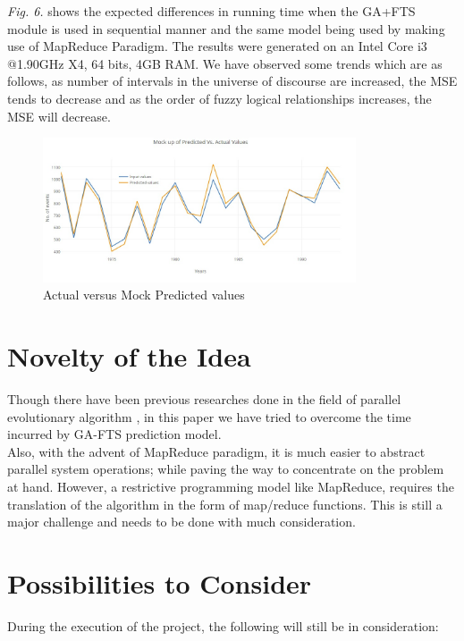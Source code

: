 \documentclass[12pt,journal,compsoc]{IEEEtran}
\begin{document}
\emph{Fig. 6.} shows the expected differences in running time when the GA+FTS module is used in sequential manner and the same model being used by making use of MapReduce Paradigm. The results were generated on an Intel Core i3 @1.90GHz X4, 64 bits, 4GB RAM.
We have observed some trends which are as follows, as number of intervals in the universe of discourse are increased, the MSE tends to decrease and as the order of fuzzy logical relationships increases, the MSE will decrease.

\begin{figure}
\includegraphics[width=3.65in]{predvsact}
\caption{Actual versus Mock Predicted values}
\end{figure}



\section{Novelty of the Idea}
Though there have been previous researches done in the field of parallel evolutionary algorithm \cite{GA-parallel}, in this paper we have tried to overcome the time incurred by GA-FTS prediction model. 
\\\indent Also, with the advent of MapReduce \cite{mapreduce} paradigm, it is much easier to abstract parallel system operations; while paving the way to concentrate on the problem at hand. However, a restrictive programming model like MapReduce, requires the translation of the algorithm in the form of map/reduce functions. This is still a major challenge and needs to be done with much consideration. 

\section{Possibilities  to Consider}
\indent During the execution of the project, the following will still be in consideration:
\end{document}
